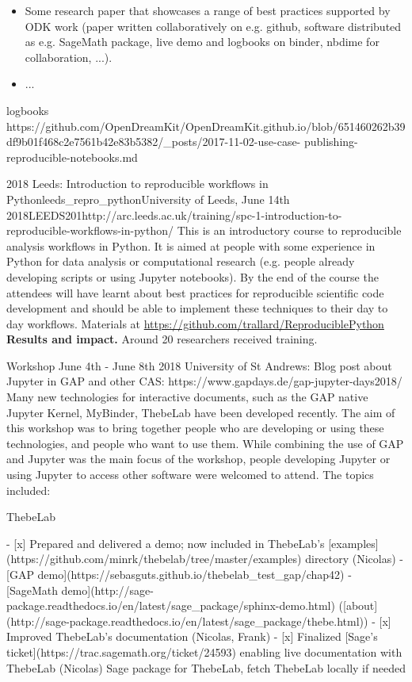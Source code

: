 \begin{Aim 1}
\begin{Aim 2}
\begin{itemize}
    https://github.com/OpenDreamKit/OpenDreamKit.github.io/blob/6faf6eb2f1532f342f86c8da633078067ca40c85/_posts/2018-03-07-opendreamkit-at-     
    the-rse-conference.md

 
\item Some research paper that showcases a range of best practices supported by ODK work (paper written collaboratively on e.g. github,
  software distributed as e.g. SageMath package, live demo and logbooks on binder, nbdime for collaboration, ...).
\item ...
\end{itemize}

      logbooks 
      https://github.com/OpenDreamKit/OpenDreamKit.github.io/blob/651460262b39df9b01f468c2e7561b42e83b5382/_posts/2017-11-02-use-case-
      publishing-reproducible-notebooks.md
      

\begin{event}{2018 Leeds: Introduction to reproducible workflows in Python}{leeds_repro_python}{University of Leeds, June 14th 2018}{LEEDS}{20}{1}{http://arc.leeds.ac.uk/training/spc-1-introduction-to-reproducible-workflows-in-python/}
This is an introductory course to reproducible analysis workflows in Python. It is aimed at people with some experience in Python for data analysis or computational research (e.g. people already developing scripts or using Jupyter notebooks). By the end of the course the attendees will have learnt about best practices for reproducible scientific code development and should be able to implement these techniques to their day to day workflows.
Materials at \url{https://github.com/trallard/ReproduciblePython}
\textbf{Results and impact.} Around 20 researchers received training.


Workshop June 4th - June 8th 2018 University of St Andrews:
Blog post about Jupyter in GAP and other CAS: https://www.gapdays.de/gap-jupyter-days2018/
Many new technologies for interactive documents, such as the GAP native Jupyter Kernel, MyBinder, ThebeLab have been developed recently. The aim of this workshop was to bring together people who are developing or using these technologies, and people who want to use them. While combining the use of GAP and Jupyter was the main focus of the workshop, people developing Jupyter or using Jupyter to access other software were welcomed to attend. The topics included:

      ThebeLab

- [x] Prepared and delivered a demo; now included in ThebeLab's [examples](https://github.com/minrk/thebelab/tree/master/examples) directory (Nicolas)
- [GAP demo](https://sebasguts.github.io/thebelab_test_gap/chap42)
- [SageMath demo](http://sage-package.readthedocs.io/en/latest/sage_package/sphinx-demo.html) ([about](http://sage-package.readthedocs.io/en/latest/sage_package/thebe.html))
- [x] Improved ThebeLab's documentation (Nicolas, Frank) 
- [x] Finalized [Sage's ticket](https://trac.sagemath.org/ticket/24593) enabling live documentation with ThebeLab (Nicolas)
  Sage package for ThebeLab, fetch ThebeLab locally if needed


\end{event}
\end{Aim 2}
\end{Aim 1}
